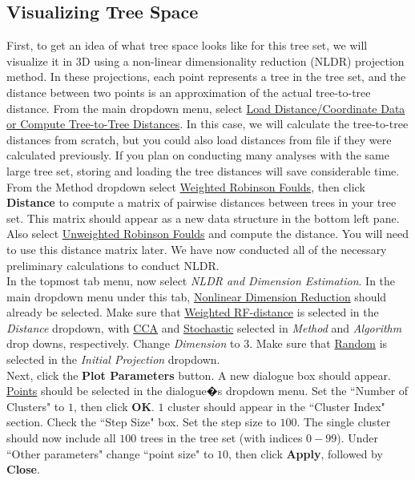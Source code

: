 \documentclass[11pt]{article}
\begin{document}
\subsection{Visualizing Tree Space}\label{subsect:VisualizeTreeSpace}

First, to get an idea of what tree space looks like for this tree set, we will visualize it in 3D using a non-linear dimensionality reduction (NLDR) projection method.  In these projections, each point represents a tree in the tree set, and the distance between two points is an approximation of the actual tree-to-tree distance. From the main dropdown menu, select \ul{Load Distance/Coordinate Data or Compute Tree-to-Tree Distances}. In this case, we will calculate the tree-to-tree distances from scratch, but you could also load distances from file if they were calculated previously. If you plan on conducting many analyses with the same large tree set, storing and loading the tree distances will save considerable time. From the Method dropdown select \ul{Weighted Robinson Foulds}, then click {\bf Distance} to compute a matrix of pairwise distances between trees in your tree set. This matrix should appear as a new data structure in the bottom left pane. Also select \ul{Unweighted Robinson Foulds} and compute the distance. You will need to use this distance matrix later. We have now conducted all of the necessary preliminary calculations to conduct NLDR.\\


In the topmost tab menu, now select {\it NLDR and Dimension Estimation}. In the main dropdown menu under this tab, \ul{Nonlinear Dimension Reduction} should already be selected. Make sure that \ul{Weighted RF-distance} is selected in the {\it Distance} dropdown, with \ul{CCA} and \ul{Stochastic} selected in {\it Method} and {\it Algorithm} drop downs, respectively. Change {\it Dimension} to $3$. Make sure that \ul{Random} is selected in the {\it Initial Projection} dropdown. \\


Next, click the {\bf Plot Parameters} button.  A new dialogue box should appear.  \ul{Points} should be selected in the dialogue�s dropdown menu. Set the ``Number of Clusters" to $1$, then click {\bf OK}.  $1$ cluster should appear in the ``Cluster Index" section.  Check the ``Step Size" box.  Set the step size to $100$.  The single cluster should now include all $100$ trees in the tree set (with indices $0 - 99$). Under ``Other parameters" change ``point size" to $10$, then click {\bf Apply}, followed by {\bf Close}. \\
\end{document}
